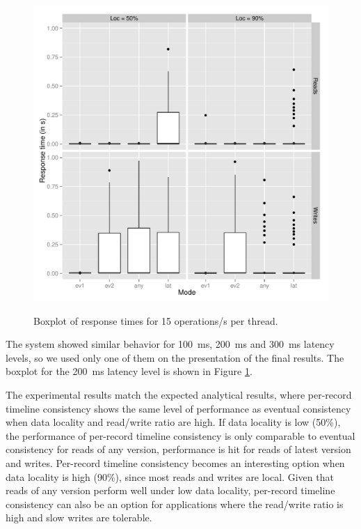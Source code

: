 \documentclass[man,floatsintext,12pt]{apa6}
\begin{document}
\begin{figure}[h!]
\caption{Boxplot of response times for 15 operations/s per thread.}
\includegraphics[width=1.0\textwidth]{boxplot200.png}
\label{fig:boxplot_dos_tempos_de_resposta}
\end{figure}

The system showed similar behavior for 100~ms, 200~ms and 300~ms latency
levels, so we used only one of them on the presentation of the final results.
The boxplot for the 200~ms latency level is shown in Figure
\ref{fig:boxplot_dos_tempos_de_resposta}.

The experimental results match the expected analytical results, where
per-record timeline consistency shows the same level of performance as eventual
consistency when data locality and read/write ratio are high.  If data locality
is low (50\%), the performance of per-record timeline consistency is only
comparable to eventual consistency for reads of any version, performance is hit
for reads of latest version and writes.  Per-record timeline consistency
becomes an interesting option when data locality is high (90\%), since most
reads and writes are local. Given that reads of any version perform well under
low data locality, per-record timeline consistency can also be an option for
applications where the read/write ratio is high and slow writes are tolerable.
\end{document}
